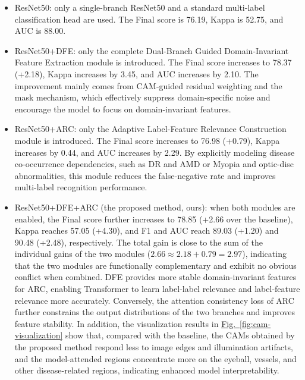 \begin{itemize}
\item

  ResNet50: only a single-branch ResNet50 and a standard multi-label classification head are used. The Final score is 76.19, Kappa is 52.75, and AUC is 88.00.
\item

  ResNet50+DFE: only the complete Dual-Branch Guided Domain-Invariant Feature Extraction module is introduced. The Final score increases to 78.37 (+2.18), Kappa increases by 3.45, and AUC increases by 2.10. The improvement mainly comes from CAM-guided residual weighting and the mask mechanism, which effectively suppress domain-specific noise and encourage the model to focus on domain-invariant features.

\item

  ResNet50+ARC: only the Adaptive Label-Feature Relevance Construction module is introduced. The Final score increases to 76.98 (+0.79), Kappa increases by 0.44, and AUC increases by 2.29. By explicitly modeling disease co-occurrence dependencies, such as DR and AMD or Myopia and optic-disc abnormalities, this module reduces the false-negative rate and improves multi-label recognition performance.
\item

  ResNet50+DFE+ARC (the proposed method, ours): when both modules are enabled, the Final score further increases to 78.85 (+2.66 over the baseline), Kappa reaches 57.05 (+4.30), and F1 and AUC reach 89.03 (+1.20) and 90.48 (+2.48), respectively. The total gain is close to the sum of the individual gains of the two modules (\(2.66 \approx 2.18 + 0.79 = 2.97\)), indicating that the two modules are functionally complementary and exhibit no obvious conflict when combined. DFE provides more stable domain-invariant features for ARC, enabling Transformer to learn label-label relevance and label-feature relevance more accurately. Conversely, the attention consistency loss of ARC further constrains the output distributions of the two branches and improves feature stability. In addition, the visualization results in \hyperref[fig:cam-visualization]{Fig.~\ref*{fig:cam-visualization}} show that, compared with the baseline, the CAMs obtained by the proposed method respond less to image edges and illumination artifacts, and the model-attended regions concentrate more on the eyeball, vessels, and other disease-related regions, indicating enhanced model interpretability.
\end{itemize}

